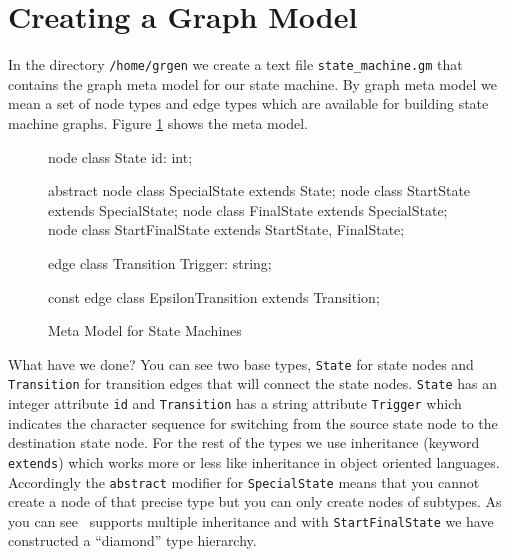 \section{Creating a Graph Model}
In the directory \texttt{/home/grgen} we create a text file \texttt{state\_machine.gm} that contains the graph meta model for our state machine.
By graph meta model we mean a set of node types and edge types which are available for building state machine graphs.
Figure \ref{fig:quick:mm} shows the meta model.
\begin{figure}[htbp]
    \centering
    \begin{grgen}
node class State {
    id: int;
}

abstract node class SpecialState extends State;
node class StartState extends SpecialState;
node class FinalState extends SpecialState;
node class StartFinalState extends StartState, FinalState;

edge class Transition {
    Trigger: string;
}

const edge class EpsilonTransition extends Transition;    
    \end{grgen}
    \caption{Meta Model for State Machines}
    \label{fig:quick:mm}
\end{figure}    
What have we done?
You can see two base types, \texttt{State} for state nodes and \texttt{Transition} for transition edges that will connect the state nodes.
\texttt{State} has an integer attribute \texttt{id} and \texttt{Transition} has a string attribute \texttt{Trigger} which indicates the character sequence for switching from the source state node to the destination state node.
For the rest of the types we use inheritance (keyword \texttt{extends}) which works more or less like inheritance in object oriented languages.
Accordingly the \texttt{abstract} modifier for \texttt{SpecialState} means that you cannot create a node of that precise type but you can only create nodes of subtypes.
As you can see \GrG\ supports multiple inheritance and with \texttt{StartFinalState} we have constructed a ``diamond'' type hierarchy.

